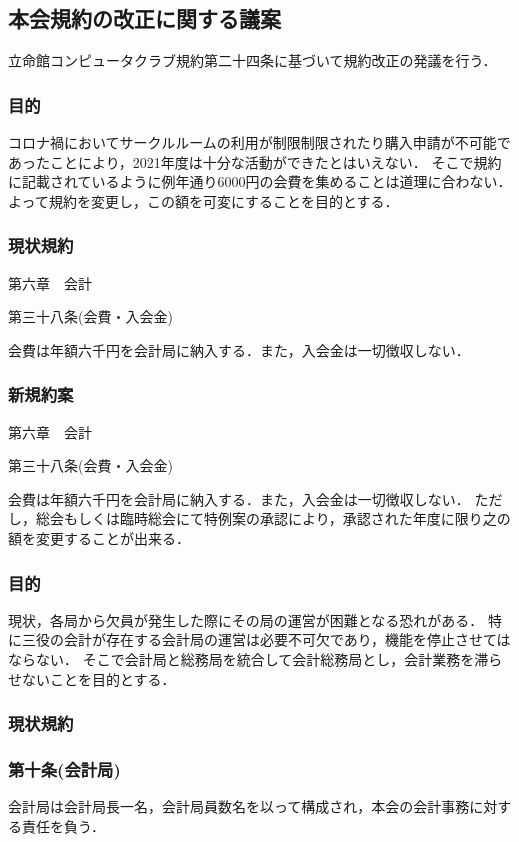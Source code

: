 \subsection*{本会規約の改正に関する議案}

立命館コンピュータクラブ規約第二十四条に基づいて規約改正の発議を行う．

\subsubsection*{目的}
コロナ禍においてサークルルームの利用が制限制限されたり購入申請が不可能であったことにより，2021年度は十分な活動ができたとはいえない．
そこで規約に記載されているように例年通り6000円の会費を集めることは道理に合わない．
よって規約を変更し，この額を可変にすることを目的とする．

\subsubsection*{現状規約}
第六章　会計

第三十八条(会費・入会金)

会費は年額六千円を会計局に納入する．また，入会金は一切徴収しない．

\subsubsection*{新規約案}
第六章　会計

第三十八条(会費・入会金)

会費は年額六千円を会計局に納入する．また，入会金は一切徴収しない．
ただし，総会もしくは臨時総会にて特例案の承認により，承認された年度に限り之の額を変更することが出来る．

\subsubsection*{目的}
現状，各局から欠員が発生した際にその局の運営が困難となる恐れがある．
特に三役の会計が存在する会計局の運営は必要不可欠であり，機能を停止させてはならない．
そこで会計局と総務局を統合して会計総務局とし，会計業務を滞らせないことを目的とする．

\subsubsection*{現状規約}
\subsubsection*{第十条(会計局)}
会計局は会計局長一名，会計局員数名を以って構成され，本会の会計事務に対する責任を負う．

